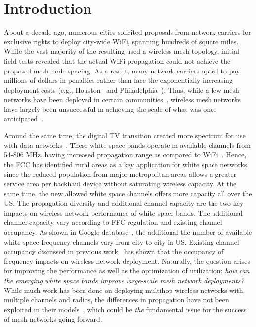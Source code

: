 \section{Introduction}
\label{sec:introduction}


About a decade ago, numerous cities solicited proposals from
network carriers for exclusive rights to deploy city-wide WiFi,
spanning hundreds of square miles.  
While the vast majority of the resulting used
a wireless mesh topology, initial field tests revealed that the 
actual WiFi propagation could not achieve the proposed mesh node
spacing. As a result, many network carriers opted to pay millions of 
dollars in penalties rather than face the exponentially-increasing
deployment costs (e.g., Houston~\cite{cnet_aug07} and 
Philadelphia~\cite{arstechnica_may08}). Thus, while a few mesh 
networks have been deployed in certain communities~\cite{CRSK06},
wireless mesh networks have largely been unsuccessful in achieving 
the scale of what was once anticipated~\cite{taps}.

Around the same time, the digital TV transition created more
spectrum for use with data networks~\cite{fccwhitespace}. These white 
space bands operate in available channels from 54-806 MHz, having
increased propagation range as compared to WiFi~\cite{balanis2012antenna}. 
Hence, the FCC has identified rural areas as a key application for 
white space networks since the reduced
population from major metropolitan areas allows a greater service area
per backhaul device without saturating wireless capacity.
At the same time, the new allowed white space channels
offers more capacity all over the US. The propagation diversity
and additional channel capacity are the two key impacts on
wireless network performance of white space bands.
The additional channel capacity vary according to FFC regulation and
existing channel occupancy. As shown in Google database~\cite{googledatabase}, 
the additional the number of available white
space frequency channels vary from city to city in US. 
Existing channel occupancy discussed in previous work~\cite{pcuiwinmee} 
has shown that the occupancy of frequency impacts on wireless network deployment.
Naturally, the question arises for improving the performance
as well as the optimization of utilization: {\it how can the emerging white space bands improve 
large-scale mesh network deployments?}  While much work has been done 
on deploying multihop wireless networks with multiple channels and 
radios, the differences in propagation have not been exploited in their 
models~\cite{tang2005interference, long2013fair,doraghinejad2014channel}, 
which could be {\it the} fundamental issue for the success of mesh 
networks going forward.


